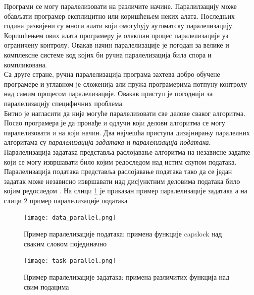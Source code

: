 \documentclass[12pt,oneside]{memoir}
\begin{document}
 Програми се могу паралелизовати на различите начине. Паралилзацију може обављати програмер експлицитно или коришћењем неких алата. Последњих година развијени су многи алати који омогућују аутоматску паралелизацију. Коришћењем ових алата програмеру је олакшан процес паралелизације уз ограничену контролу. Овакав начин паралелизације је погодан за велике и комплексне системе код којих би ручна паралелизација била спора и компликована.
 \\
 \indent Са друге стране, ручна паралелизација програма захтева добро обучене програмере и углавном је сложенија али пружа програмерима потпуну контролу над самим процесом паралелизације. Овакав приступ је погоднији за паралелизацију специфичних проблема.
 \\
  \indent  Битно је нагласити да није могуће паралелизовати све делове сваког алгоритма. Посао програмера је да пронађе и одлучи који делови алгоритма се могу паралелизовати и на који начин.
 Два најчешћа приступа дизајнирању паралелних алгоритама су \emph{паралелизација задатака} и \emph{паралелизација података}. 
Паралелизација задатака представља раслојавање алгоритма на независне задатке који се могу извршавати било којим редоследом над истим скупом података.
Паралелизација података представља раслојавање података тако да се један задатак може независно извршавати над дисјунктним деловима података било којим редоследом \cite{art_conc}. 
На слици  \ref{fig:data_parallel} је приказан пример паралелизације задатака а на слици \ref{fig:task_parallel} пример паралелизације података

\begin{figure}[!ht]
  \centering
  \texttt{[image: data\_parallel.png]}
  \caption{Пример паралелизације података: примена функције capslock над сваким словом појединачно}
  \label{fig:data_parallel}
\end{figure}

\begin{figure}[!ht]
  \centering
  \texttt{[image: task\_parallel.png]}
  \caption{Пример паралелизације задатака: примена различитих функција над свим подацима}
  \label{fig:task_parallel}
\end{figure}
\end{document}
